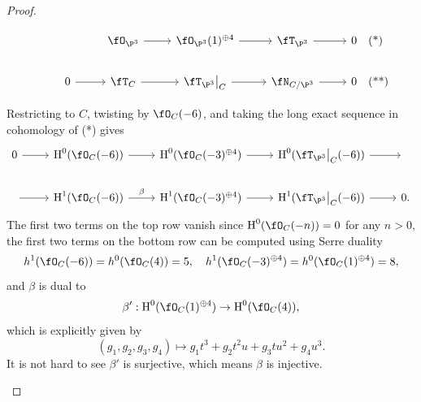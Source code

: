 \documentclass[a4paper]{article}
\begin{document}
\begin{enumerate} [label=\textbf{\arabic*.}, leftmargin=0em]
\begin{proof}
\begin{itemize} [leftmargin=0cm]
\[\begin{tikzcd}
                                & \fO_{\P^3} \arrow[r]
                                & \fO_{\P^3}(1)^{\oplus 4} \arrow[r]
                                & \fT_{\P^3} \arrow[r]
                                & 0\rlap{\hspace{1em}\text{(*)}} \\
                                0 \arrow[r]
                                & \fT_C \arrow[r]
                                & \restr{\fT_{\P^3}}{C} \arrow[r]
                                & \fN_{C/\P^3} \arrow[r]
                                & 0\rlap{\hspace{1em}\text{(**)}}
                            \end{tikzcd}
                        \]

                        Restricting to $C$, twisting by $\fO_C(-6)$, and taking the long exact sequence in cohomology of (*) gives
                        \[ \begin{tikzcd}
                                0 \arrow[r]  & {\cH^0(\fO_C(-6))} \arrow[r] & {\cH^0(\fO_C(-3)^{\oplus 4})} \arrow[r] & {\cH^0(\restr{\fT_{\P^3}}{C}(-6))} \arrow[r] & {} \\
                                {} \arrow[r] & {\cH^1(\fO_C(-6))} \arrow[r, "\beta"] & {\cH^1(\fO_C(-3)^{\oplus 4})} \arrow[r] & {\cH^1(\restr{\fT_{\P^3}}{C}(-6))} \arrow[r] & 0.
                            \end{tikzcd} \]
                        The first two terms on the top row vanish since $\cH^0(\fO_C(-n)) = 0$ for any $n > 0$, the first two terms on the bottom row can be computed using Serre duality
                        \begin{equation*}
                            \cdh^1(\fO_C(-6)) = \cdh^0(\fO_C(4)) = 5, \quad \cdh^1(\fO_C(-3)^{\oplus 4}) = \cdh^0(\fO_C(1)^{\oplus 4}) = 8,
                        \end{equation*}
                        and $\beta$ is dual to
                        \begin{equation*}
                            \beta' : \cH^0(\fO_C(1)^{\oplus 4}) \to \cH^0(\fO_C(4)),
                        \end{equation*}
                        which is explicitly given by
                        \begin{equation*}
                            (g_1, g_2, g_3, g_4) \mapsto g_1 t^3 + g_2 t^2u + g_3 tu^2 + g_4 u^3.
                        \end{equation*}
                        It is not hard to see $\beta'$ is surjective, which means $\beta$ is injective.

\end{itemize}
\end{proof}
\end{enumerate}
\end{document}
